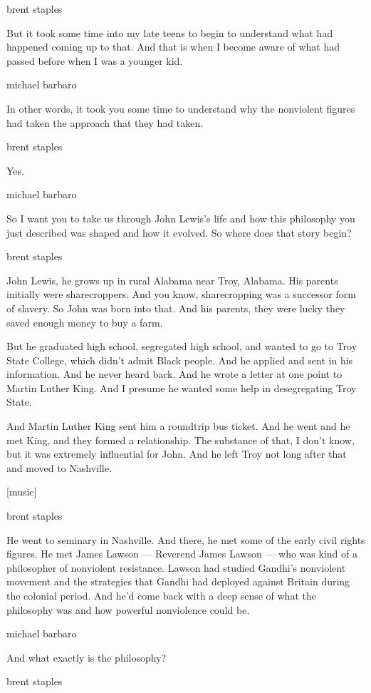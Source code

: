 brent staples

But it took some time into my late teens to begin to understand what had
happened coming up to that. And that is when I become aware of what had
passed before when I was a younger kid.

michael barbaro

In other words, it took you some time to understand why the nonviolent
figures had taken the approach that they had taken.

brent staples

Yes.

michael barbaro

So I want you to take us through John Lewis's life and how this
philosophy you just described was shaped and how it evolved. So where
does that story begin?

brent staples

John Lewis, he grows up in rural Alabama near Troy, Alabama. His parents
initially were sharecroppers. And you know, sharecropping was a
successor form of slavery. So John was born into that. And his parents,
they were lucky they saved enough money to buy a farm.

But he graduated high school, segregated high school, and wanted to go
to Troy State College, which didn't admit Black people. And he applied
and sent in his information. And he never heard back. And he wrote a
letter at one point to Martin Luther King. And I presume he wanted some
help in desegregating Troy State.

And Martin Luther King sent him a roundtrip bus ticket. And he went and
he met King, and they formed a relationship. The substance of that, I
don't know, but it was extremely influential for John. And he left Troy
not long after that and moved to Nashville.

{[}music{]}

brent staples

He went to seminary in Nashville. And there, he met some of the early
civil rights figures. He met James Lawson --- Reverend James Lawson ---
who was kind of a philosopher of nonviolent resistance. Lawson had
studied Gandhi's nonviolent movement and the strategies that Gandhi had
deployed against Britain during the colonial period. And he'd come back
with a deep sense of what the philosophy was and how powerful
nonviolence could be.

michael barbaro

And what exactly is the philosophy?

brent staples

